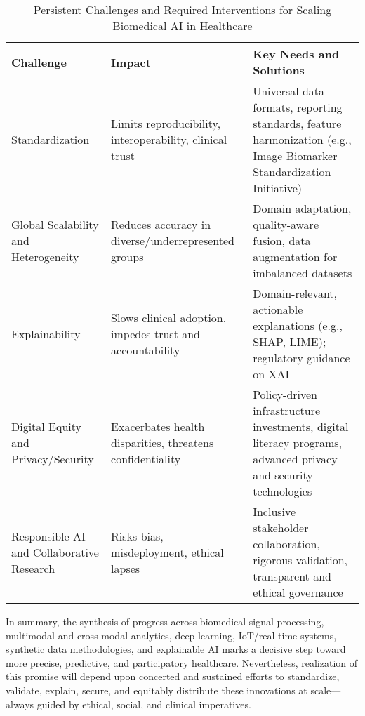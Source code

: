 \documentclass[11pt]{article}
\begin{document}
\begin{table}[h!]
\centering
\caption{Persistent Challenges and Required Interventions for Scaling Biomedical AI in Healthcare}
\label{tab:challenges_summary}
\begin{tabular}{|p{4cm}|p{4cm}|p{5cm}|}
\hline
\textbf{Challenge} & \textbf{Impact} & \textbf{Key Needs and Solutions} \\
\hline
Standardization & Limits reproducibility, interoperability, clinical trust & Universal data formats, reporting standards, feature harmonization (e.g., Image Biomarker Standardization Initiative) \\
\hline
Global Scalability and Heterogeneity & Reduces accuracy in diverse/underrepresented groups & Domain adaptation, quality-aware fusion, data augmentation for imbalanced datasets \\
\hline
Explainability & Slows clinical adoption, impedes trust and accountability & Domain-relevant, actionable explanations (e.g., SHAP, LIME); regulatory guidance on XAI\\
\hline
Digital Equity and Privacy/Security & Exacerbates health disparities, threatens confidentiality & Policy-driven infrastructure investments, digital literacy programs, advanced privacy and security technologies \\
\hline
Responsible AI and Collaborative Research & Risks bias, misdeployment, ethical lapses & Inclusive stakeholder collaboration, rigorous validation, transparent and ethical governance \\
\hline
\end{tabular}
\end{table}

In summary, the synthesis of progress across biomedical signal processing, multimodal and cross-modal analytics, deep learning, IoT/real-time systems, synthetic data methodologies, and explainable AI marks a decisive step toward more precise, predictive, and participatory healthcare. Nevertheless, realization of this promise will depend upon concerted and sustained efforts to standardize, validate, explain, secure, and equitably distribute these innovations at scale—always guided by ethical, social, and clinical imperatives.



\end{document}
